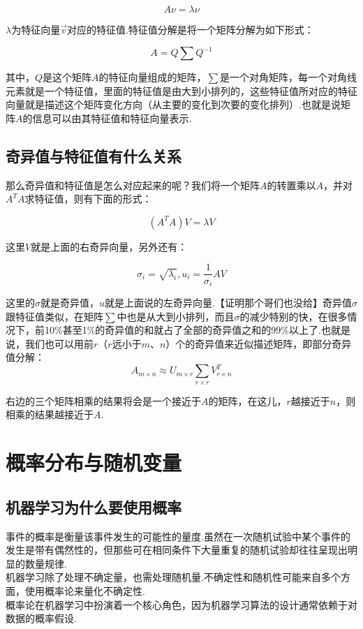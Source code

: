 \[
A\nu = \lambda \nu
\]

\(\lambda\)为特征向量\(\vec{v}\)对应的特征值.特征值分解是将一个矩阵分解为如下形式：

\[
A=Q\sum Q^{-1}
\]

其中，\(Q\)是这个矩阵\(A\)的特征向量组成的矩阵，\(\sum\)是一个对角矩阵，每一个对角线元素就是一个特征值，里面的特征值是由大到小排列的，这些特征值所对应的特征向量就是描述这个矩阵变化方向（从主要的变化到次要的变化排列）.也就是说矩阵\(A\)的信息可以由其特征值和特征向量表示.

\subsection{奇异值与特征值有什么关系}\label{ux5947ux5f02ux503cux4e0eux7279ux5f81ux503cux6709ux4ec0ux4e48ux5173ux7cfb}

那么奇异值和特征值是怎么对应起来的呢？我们将一个矩阵\(A\)的转置乘以\(A\)，并对\(A^TA​\)求特征值，则有下面的形式：

\[
(A^TA)V = \lambda V
\]

这里\(V​\)就是上面的右奇异向量，另外还有：

\[
\sigma_i = \sqrt{\lambda_i}, u_i=\frac{1}{\sigma_i}AV
\]

这里的\(\sigma​\)就是奇异值，\(u​\)就是上面说的左奇异向量.【证明那个哥们也没给】
​奇异值\(\sigma​\)跟特征值类似，在矩阵\(\sum​\)中也是从大到小排列，而且\(\sigma​\)的减少特别的快，在很多情况下，前10\%甚至1\%的奇异值的和就占了全部的奇异值之和的99\%以上了.也就是说，我们也可以用前\(r​\)（\(r​\)远小于\(m、n​\)）个的奇异值来近似描述矩阵，即部分奇异值分解：
\[
A_{m\times n}\approx U_{m \times r}\sum_{r\times r}V_{r \times n}^T
\]

右边的三个矩阵相乘的结果将会是一个接近于\(A\)的矩阵，在这儿，\(r\)越接近于\(n\)，则相乘的结果越接近于\(A\).

\section{概率分布与随机变量}\label{ux6982ux7387ux5206ux5e03ux4e0eux968fux673aux53d8ux91cf}

\subsection{机器学习为什么要使用概率}\label{ux673aux5668ux5b66ux4e60ux4e3aux4ec0ux4e48ux8981ux4f7fux7528ux6982ux7387}

事件的概率是衡量该事件发生的可能性的量度.虽然在一次随机试验中某个事件的发生是带有偶然性的，但那些可在相同条件下大量重复的随机试验却往往呈现出明显的数量规律.\\
​机器学习除了处理不确定量，也需处理随机量.不确定性和随机性可能来自多个方面，使用概率论来量化不确定性.\\
​概率论在机器学习中扮演着一个核心角色，因为机器学习算法的设计通常依赖于对数据的概率假设.

